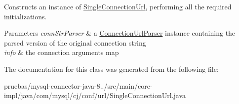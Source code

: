 Constructs an instance of \mbox{\hyperlink{classcom_1_1mysql_1_1cj_1_1conf_1_1url_1_1_single_connection_url}{Single\+Connection\+Url}}, performing all the required initializations.


\begin{DoxyParams}{Parameters}
{\em conn\+Str\+Parser} & a \mbox{\hyperlink{classcom_1_1mysql_1_1cj_1_1conf_1_1_connection_url_parser}{Connection\+Url\+Parser}} instance containing the parsed version of the original connection string \\
\hline
{\em info} & the connection arguments map \\
\hline
\end{DoxyParams}


The documentation for this class was generated from the following file\+:\begin{DoxyCompactItemize}
\item 
pruebas/mysql-\/connector-\/java-\/8../src/main/core-\/impl/java/com/mysql/cj/conf/url/Single\+Connection\+Url.\+java\end{DoxyCompactItemize}
